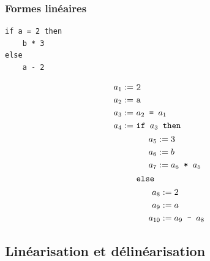 \begin{frame}[fragile]
    \frametitle{Formes linéaires}

    \begin{minipage}{0.5\textwidth}
        \begin{verbatim}
if a = 2 then
    b * 3
else
    a - 2
        \end{verbatim}
    \end{minipage}%
    \begin{minipage}{0.5\textwidth}
        \small \begin{align*}
            a_1 :=\  & \texttt{2}                                      \\
            a_2 :=\  & \texttt{a}                                      \\
            a_3 :=\  & a_2 \texttt{ = } a_1                            \\
            a_4 :=\  & \texttt{if } a_3 \texttt{ then}                 \\
                     & \hspace{0.5cm} \begin{aligned}
                                          a_5 & := 3                    \\
                                          a_6 & := b                    \\
                                          a_7 & := a_6 \texttt{ * } a_5
                                      \end{aligned}    \\
                     & \texttt{else}                                   \\
                     & \hspace{0.5cm} \begin{aligned}
                                          a_8    & := 2                    \\
                                          a_9    & := a                    \\
                                          a_{10} & := a_9 \texttt{ - } a_8
                                      \end{aligned}
        \end{align*}
    \end{minipage}
\end{frame}

\subsection{Linéarisation et délinéarisation}

